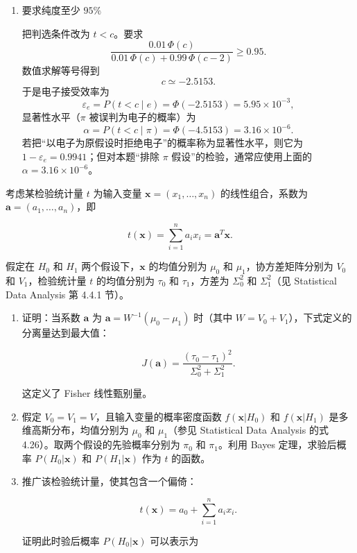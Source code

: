 \begin{question}
\begin{solution}
\begin{enumerate}
\item 要求纯度至少 \(95\%\)

把判选条件改为 \(t<c\)。要求
\[
\frac{0.01\,\Phi(c)}{0.01\,\Phi(c)+0.99\,\Phi(c-2)}\ge0.95.
\]
数值求解等号得到
\[
c\simeq -2.5153.
\]
于是电子接受效率为
\[
\varepsilon_e=P(t<c\mid e)=\Phi(-2.5153)=5.95\times10^{-3},
\]
显著性水平（\(\pi\) 被误判为电子的概率）为
\[
\alpha=P(t<c\mid\pi)=\Phi(-4.5153)=3.16\times10^{-6}.
\]
若把“以电子为原假设时拒绝电子”的概率称为显著性水平，则它为
\(1-\varepsilon_e=0.9941\)；但对本题“排除 \(\pi\) 假设”的检验，通常应使用上面的
\(\alpha=3.16\times10^{-6}\)。
\end{enumerate}
\end{solution}
\end{question}


\begin{question}
考虑某检验统计量 \(t\) 为输入变量 \(\mathbf{x}=(x_1,\ldots,x_n)\)
的线性组合，系数为 \(\mathbf{a}=(a_1,\ldots,a_n)\)，即

\[
t(\mathbf{x})=\sum_{i=1}^{n}a_i x_i=\mathbf{a}^T\mathbf{x}.
\]

假定在 \(H_0\) 和 \(H_1\) 两个假设下，\(\mathbf{x}\) 的均值分别为
\(\mu_0\) 和 \(\mu_1\)，协方差矩阵分别为 \(V_0\) 和 \(V_1\)，检验统计量
\(t\) 的均值分别为 \(\tau_0\) 和 \(\tau_1\)，方差为 \(\Sigma_0^2\) 和
\(\Sigma_1^2\)（见 Statistical Data Analysis 第 4.4.1 节）。

\begin{enumerate}
\item 证明：当系数 \(\mathbf{a}\) 为 \(\mathbf{a}=W^{-1}(\mu_0-\mu_1)\)
时（其中 \(W=V_0+V_1\)），下式定义的分离量达到最大值：

\[
J(\mathbf{a})=\frac{(\tau_0-\tau_1)^2}{\Sigma_0^2+\Sigma_1^2}.
\]

这定义了 Fisher 线性甄别量。

\item 假定 \(V_0=V_1=V\)，且输入变量的概率密度函数 \(f(\mathbf{x}|H_0)\)
和 \(f(\mathbf{x}|H_1)\) 是多维高斯分布，均值分别为 \(\mu_0\) 和
\(\mu_1\)（参见 Statistical Data Analysis 的式
4.26）。取两个假设的先验概率分别为 \(\pi_0\) 和 \(\pi_1\)。利用 Bayes
定理，求验后概率 \(P(H_0|\mathbf{x})\) 和 \(P(H_1|\mathbf{x})\) 作为
\(t\) 的函数。

\item 推广该检验统计量，使其包含一个偏倚：

\[
t(\mathbf{x})=a_0+\sum_{i=1}^{n}a_i x_i.
\]

证明此时验后概率 \(P(H_0|\mathbf{x})\) 可以表示为


\end{enumerate}
\end{question}
